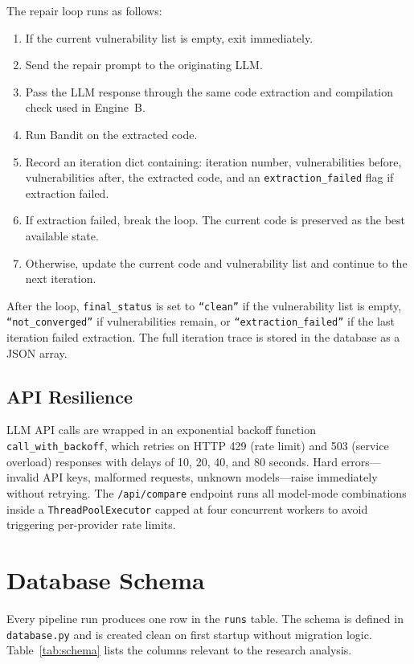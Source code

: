 \documentclass[12pt,a4paper]{report}
\begin{document}
The repair loop runs as follows:

\begin{enumerate}
  \item If the current vulnerability list is empty, exit immediately.
  \item Send the repair prompt to the originating LLM.
  \item Pass the LLM response through the same code extraction and
        compilation check used in Engine~B.
  \item Run Bandit on the extracted code.
  \item Record an iteration dict containing: iteration number,
        vulnerabilities before, vulnerabilities after, the extracted code,
        and an \texttt{extraction\_failed} flag if extraction failed.
  \item If extraction failed, break the loop. The current code is preserved
        as the best available state.
  \item Otherwise, update the current code and vulnerability list and
        continue to the next iteration.
\end{enumerate}

After the loop, \texttt{final\_status} is set to \texttt{``clean''} if the
vulnerability list is empty, \texttt{``not\_converged''} if vulnerabilities
remain, or \texttt{``extraction\_failed''} if the last iteration failed
extraction. The full iteration trace is stored in the database as a JSON array.

\subsection{API Resilience}
\label{ssec:resilience}

LLM API calls are wrapped in an exponential backoff function
\texttt{call\_with\_backoff}, which retries on HTTP 429 (rate limit) and 503
(service overload) responses with delays of 10, 20, 40, and 80 seconds. Hard
errors---invalid API keys, malformed requests, unknown models---raise immediately
without retrying. The \texttt{/api/compare} endpoint runs all model-mode
combinations inside a \texttt{ThreadPoolExecutor} capped at four concurrent
workers to avoid triggering per-provider rate limits.

\section{Database Schema}
\label{sec:db}

Every pipeline run produces one row in the \texttt{runs} table. The schema is
defined in \texttt{database.py} and is created clean on first startup without
migration logic. Table~\ref{tab:schema} lists the columns relevant to the
research analysis.
\end{document}
